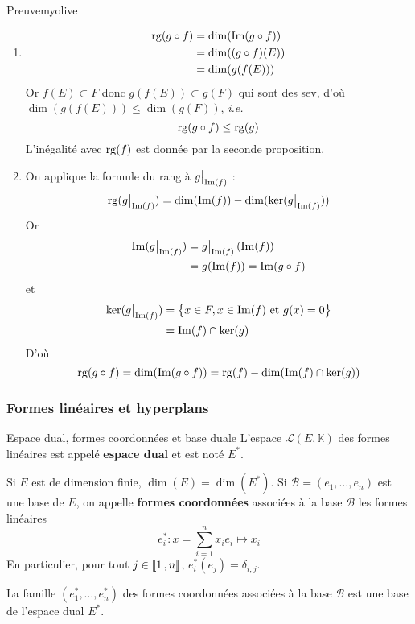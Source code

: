     \begin{demo}{Preuve}{myolive}
        \begin{enumerate}
            \item \begin{align*}
                \operatorname{rg}(g \circ f)
                &= \dim(\operatorname{Im}(g \circ f)) \\
                &= \dim((g \circ f)(E)) \\
                &= \dim(g(f(E)))
            \end{align*}
            Or $f(E) \subset F$ donc $g(f(E)) \subset g(F)$ qui sont des sev, d’où $\dim(g(f(E))) \leq \dim(g(F))$, \textit{i.e.}
            \[ \operatorname{rg}(g \circ f) \leq \operatorname{rg}(g) \]
            L’inégalité avec $\operatorname{rg}(f)$ est donnée par la seconde proposition.
            \item On applique la formule du rang à $\restr{g}{\Ima(f)}$ :
            \[ \rg(\restr{g}{\Ima(f)}) = \dim(\Ima(f)) - \dim(\ker(\restr{g}{\Ima(f)})) \]   
            Or \begin{align*}
                \Ima(\restr{g}{\Ima(f)}) 
                &= \restr{g}{\Ima(f)}\left(\Ima(f)\right) \\
                &= g(\Ima(f)) = \Ima(g \circ f)
            \end{align*}
            et \begin{align*}
                \ker(\restr{g}{\Ima(f)}) 
                &= \big\{ x \in F, x \in \Ima(f) \text{ et } g(x) = 0 \big\} \\
                &= \Ima(f) \cap \ker(g)
            \end{align*}
            D’où 
            \[ \operatorname{rg}(g \circ f) = \dim(\operatorname{Im}(g \circ f)) = \operatorname{rg}(f) - \dim(\operatorname{Im}(f) \cap \ker(g)) \]
        \end{enumerate}
    \end{demo}

    \subsubsection{Formes linéaires et hyperplans}

    \begin{defitheo}{Espace dual, formes coordonnées et base duale}{}
        L’espace $\mathcal{L}(E,\mathbb{K})$ des formes linéaires est appelé \textbf{espace dual} et est noté $E^*$. 

        Si $E$ est de dimension finie, $\dim(E) = \dim(E^*)$. Si $\mathcal{B}= (e_1,\ldots,e_n)$ est une base de $E$, on appelle \textbf{formes coordonnées} associées à la base $\mathcal{B}$ les formes linéaires 
        \[ e_i^* : x =\sum_{i=1}^{n} x_i e_i \longmapsto x_i \]    
        En particulier, pour tout $j \in \left\llbracket 1 \, , n \right\rrbracket$, $e_i^*(e_j) = \delta_{i,j}$. 

        La famille $(e_1^*, \ldots, e_n^*)$ des formes coordonnées associées à la base $\mathcal{B}$ est une base de l’espace dual $E^*$.
    \end{defitheo}

